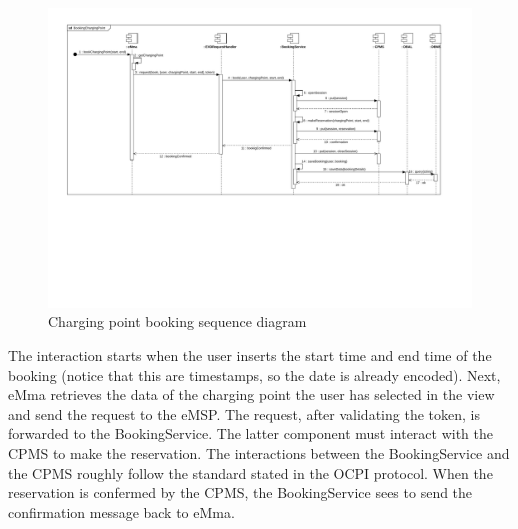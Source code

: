 \begin{figure}[H]
    \centering
    \includegraphics[trim={0 4cm 0 0},clip, width=1\textwidth]{Images/cp2/runtime/Booking_emsp_view.pdf}
    \caption{Charging point booking sequence diagram}
\end{figure}
The interaction starts when the user inserts the start time and end time of the booking (notice that this are timestamps, so the date is already encoded). Next, eMma retrieves the data of the charging point the user has selected in the view and send the request to the eMSP. The request, after validating the token, is forwarded to the BookingService. The latter component must interact with the CPMS to make the reservation. The interactions between the BookingService and the CPMS roughly follow the standard stated in the OCPI protocol. When the reservation is confermed by the CPMS, the BookingService sees to send the confirmation message back to eMma.

